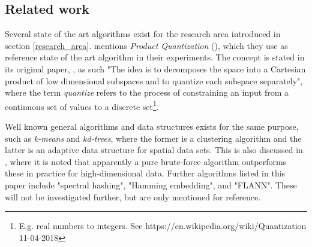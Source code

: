\subsection{Related work}
\label{state_of_the_art}
Several state of the art algorithms exist for the research area introduced in section \ref{research_area}. \cite{wagner17} mentions \textit{Product Quantization} (\pq{}), which they use as reference state of the art algorithm in their experiments. The \pq{} concept is stated in its original paper, \cite{schmid9}, as such "The idea is to decomposes the space into a Cartesian product of low dimensional subspaces and to quantize each subspace separately", where the term \textit{quantize} refers to the process of constraining an input from a continuous set of values to a discrete set\footnote{E.g. real numbers to integers. See https://en.wikipedia.org/wiki/Quantization 11-04-2018}.

Well known general algorithms and data structures exists for the same purpose, such as \textit{k-means} and \textit{kd-trees}, where the former is a clustering algorithm and the latter is an adaptive data structure for spatial data sets. This is also discussed in \cite{schmid9}, where it is noted that apparently a pure brute-force algorithm outperforms these in practice for high-dimensional data. Further algorithms listed in this paper include "spectral hashing"\cite{weiss8}, "Hamming embedding"\cite{jegou8}, and "FLANN"\cite{muja9}. These will not be investigated further, but are only mentioned for reference.
